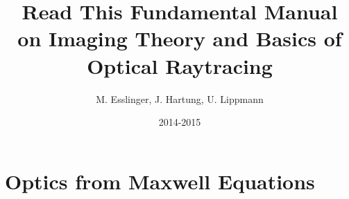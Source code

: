 \documentclass[12pt,a4paper,twoside,openright,BCOR10mm,headsepline,titlepage,abstracton,chapterprefix,final]{scrreprt}
\begin{document}

\titlehead{ }
\subject{Pyrate -- Optical raytracing based on Python}
\title{Read This Fundamental Manual \\ on Imaging Theory and Basics of Optical Raytracing}
\author{M. Esslinger, J. Hartung, U. Lippmann}
\date{2014-2015}
\publishers{}
\maketitle

\onehalfspacing

\tableofcontents

\cleardoublepage


\singlespacing


\chapter{Optics from Maxwell Equations}
\end{document}
